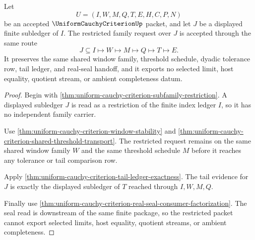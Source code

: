 \begin{theorem}
\label{thm:uniform-cauchy-criterion-index-restriction}
Let
$$
U=(I,W,M,Q,T,E,H,C,P,N)
$$
be an accepted $\UniformCauchyCriterionUp$ packet, and let $J$ be a displayed finite subledger of $I$. The restricted family request over $J$ is accepted through the same route
$$
J \subseteq I \longmapsto W \longmapsto M \longmapsto Q \longmapsto T \longmapsto E.
$$
It preserves the same shared window family, threshold schedule, dyadic tolerance row, tail ledger, and real-seal handoff, and it exports no selected limit, host equality, quotient stream, or ambient completeness datum.
\end{theorem}
\begin{proof}
Begin with \autoref{thm:uniform-cauchy-criterion-subfamily-restriction}. A displayed subledger $J$ is read as a restriction of the finite index ledger $I$, so it has no independent family carrier.

Use \autoref{thm:uniform-cauchy-criterion-window-stability} and \autoref{thm:uniform-cauchy-criterion-shared-threshold-transport}. The restricted request remains on the same shared window family $W$ and the same threshold schedule $M$ before it reaches any tolerance or tail comparison row.

Apply \autoref{thm:uniform-cauchy-criterion-tail-ledger-exactness}. The tail evidence for $J$ is exactly the displayed subledger of $T$ reached through $I,W,M,Q$.

Finally use \autoref{thm:uniform-cauchy-criterion-real-seal-consumer-factorization}. The seal read is downstream of the same finite package, so the restricted packet cannot export selected limits, host equality, quotient streams, or ambient completeness.
\end{proof}

